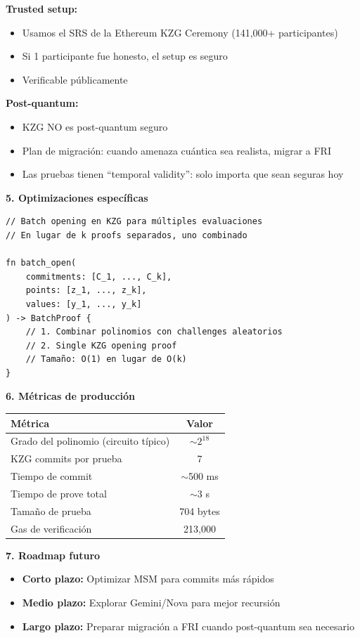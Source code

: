 \documentclass[11pt,a4paper,twoside,openright]{book}
\theoremstyle{definition}
\theoremstyle{plain}
\theoremstyle{remark}
\begin{document}
\begin{bancozk}
\textbf{Trusted setup:}
\begin{itemize}
    \item Usamos el SRS de la Ethereum KZG Ceremony (141,000+ participantes)
    \item Si 1 participante fue honesto, el setup es seguro
    \item Verificable públicamente
\end{itemize}

\textbf{Post-quantum:}
\begin{itemize}
    \item KZG NO es post-quantum seguro
    \item Plan de migración: cuando amenaza cuántica sea realista, migrar a FRI
    \item Las pruebas tienen ``temporal validity'': solo importa que sean seguras hoy
\end{itemize}

\textbf{5. Optimizaciones específicas}

\begin{verbatim}
// Batch opening en KZG para múltiples evaluaciones
// En lugar de k proofs separados, uno combinado

fn batch_open(
    commitments: [C_1, ..., C_k],
    points: [z_1, ..., z_k], 
    values: [y_1, ..., y_k]
) -> BatchProof {
    // 1. Combinar polinomios con challenges aleatorios
    // 2. Single KZG opening proof
    // Tamaño: O(1) en lugar de O(k)
}
\end{verbatim}

\textbf{6. Métricas de producción}

\begin{center}
\begin{tabular}{lc}
\toprule
\textbf{Métrica} & \textbf{Valor} \\
\midrule
Grado del polinomio (circuito típico) & $\sim 2^{18}$ \\
KZG commits por prueba & 7 \\
Tiempo de commit & $\sim$500 ms \\
Tiempo de prove total & $\sim$3 s \\
Tamaño de prueba & 704 bytes \\
Gas de verificación & 213,000 \\
\bottomrule
\end{tabular}
\end{center}

\textbf{7. Roadmap futuro}

\begin{itemize}
    \item \textbf{Corto plazo:} Optimizar MSM para commits más rápidos
    \item \textbf{Medio plazo:} Explorar Gemini/Nova para mejor recursión
    \item \textbf{Largo plazo:} Preparar migración a FRI cuando post-quantum sea necesario
\end{itemize}
\end{bancozk}
\end{document}
